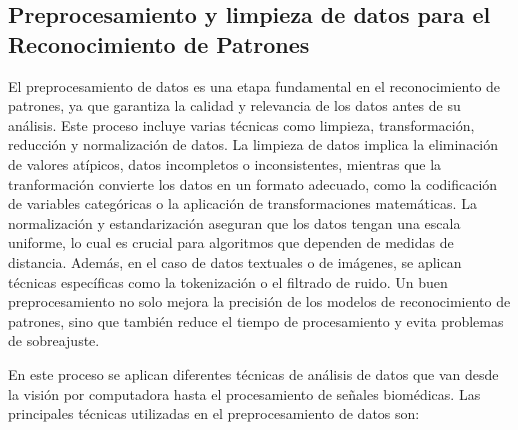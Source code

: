 \subsection{Preprocesamiento y limpieza de datos para el Reconocimiento de Patrones}

El preprocesamiento de datos es una etapa fundamental en el reconocimiento de 
patrones, ya que garantiza la calidad y relevancia de los datos antes de su 
análisis. Este proceso incluye varias técnicas como limpieza, transformación, 
reducción y normalización de datos. La limpieza de datos implica la eliminación de 
valores atípicos, datos incompletos o inconsistentes, mientras que la tranformación 
convierte los datos en un formato adecuado, como la codificación de variables 
categóricas o la aplicación de transformaciones matemáticas. La normalización y 
estandarización aseguran que los datos tengan una escala uniforme, lo cual es 
crucial para algoritmos que dependen de medidas de distancia. Además, en el caso de 
datos textuales o de imágenes, se aplican técnicas específicas como la tokenización 
o el filtrado de ruido. Un buen preprocesamiento no solo mejora la precisión de los 
modelos de reconocimiento de patrones, sino que también reduce el tiempo de 
procesamiento y evita problemas de sobreajuste.

En este proceso se aplican diferentes técnicas de análisis de datos que van desde
la visión por computadora hasta el procesamiento de señales biomédicas. Las 
principales técnicas utilizadas en el preprocesamiento de datos son:

